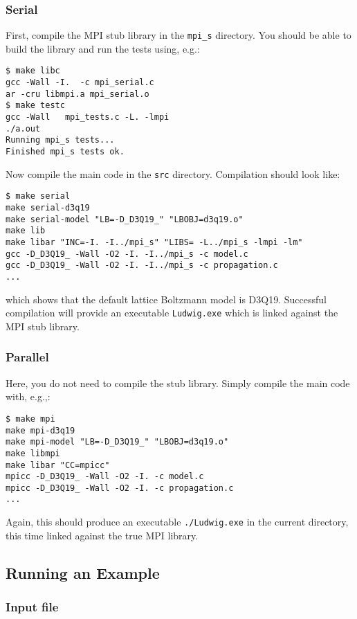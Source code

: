 \subsubsection{Serial}
\label{section:quick-serial}

First, compile the MPI stub library in the \texttt{mpi\_s}
directory. You should be able to build the library and run the
tests using, e.g.:

\begin{lstlisting}
$ make libc
gcc -Wall -I.  -c mpi_serial.c
ar -cru libmpi.a mpi_serial.o
$ make testc
gcc -Wall   mpi_tests.c -L. -lmpi
./a.out
Running mpi_s tests...
Finished mpi_s tests ok.
\end{lstlisting}

Now compile the main code in the \texttt{src} directory.
Compilation should look like:

\begin{lstlisting}
$ make serial
make serial-d3q19
make serial-model "LB=-D_D3Q19_" "LBOBJ=d3q19.o"
make lib
make libar "INC=-I. -I../mpi_s" "LIBS= -L../mpi_s -lmpi -lm"
gcc -D_D3Q19_ -Wall -O2 -I. -I../mpi_s -c model.c
gcc -D_D3Q19_ -Wall -O2 -I. -I../mpi_s -c propagation.c
...
\end{lstlisting}
which shows that the default lattice Boltzmann model is D3Q19.
Successful compilation will provide an executable \texttt{Ludwig.exe}
which is linked against the MPI stub library.

\subsubsection{Parallel}

Here, you do not need to compile the stub library. Simply compile
the main code with, e.g.,:
\begin{lstlisting}
$ make mpi
make mpi-d3q19
make mpi-model "LB=-D_D3Q19_" "LBOBJ=d3q19.o"
make libmpi
make libar "CC=mpicc"
mpicc -D_D3Q19_ -Wall -O2 -I. -c model.c
mpicc -D_D3Q19_ -Wall -O2 -I. -c propagation.c
...
\end{lstlisting}

Again, this should produce an executable \texttt{./Ludwig.exe}
in the current directory, this time linked against the true MPI
library.

\subsection{Running an Example}

\subsubsection{Input file}

